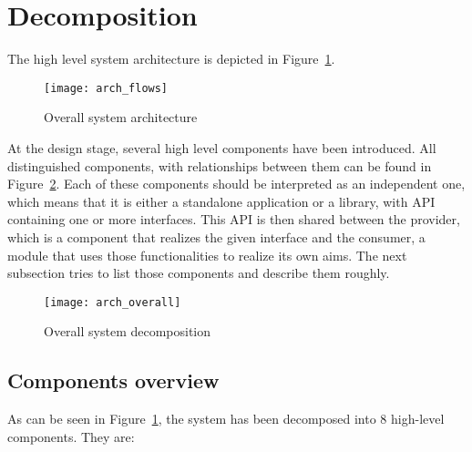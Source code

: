 %
\section{Decomposition}
\label{sec:arch_decomposition}

The high level system architecture is depicted in Figure~\ref{fig:arch_overall}. 

\begin{figure}[ht]
\centering
\texttt{[image: arch\_flows]}
\caption{Overall system architecture}
\label{fig:arch_overall}
\end{figure}

At the design stage, several high level components have been introduced. All distinguished components, with relationships between them can be found in Figure~\ref{fig:decomposition_overall}. Each of these components should be interpreted as an independent one, which means that it is either a standalone application or a library, with API containing one or more interfaces. This API is then shared between the provider, which is a component that realizes the given interface and the consumer, a module that uses those functionalities to realize its own aims. The next subsection tries to list those components and describe them roughly.

\begin{figure}[ht]
\centering
\texttt{[image: arch\_overall]}
\caption{Overall system decomposition}
\label{fig:decomposition_overall}
\end{figure}

\subsection{Components overview}

As can be seen in Figure~\ref{fig:arch_overall}, the system has been decomposed into 8 high-level components. They are:

